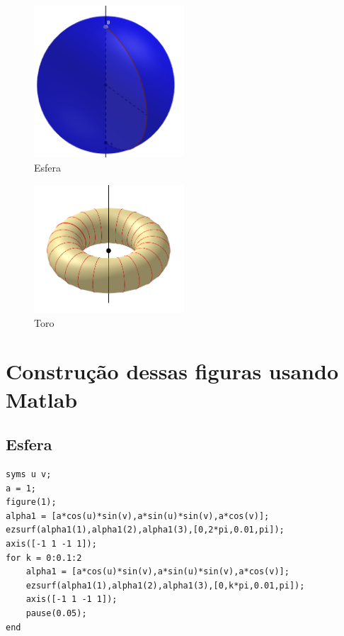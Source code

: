 \documentclass[a4paper]{article}
\begin{document}
\begin{figure}[h!]
  \caption{Esfera}
  \centering
  \includegraphics[width=0.5\textwidth]{cone_revolucao.png}
\end{figure}

\begin{figure}[h!]
  \caption{Toro}
  \centering
  \includegraphics[width=0.5\textwidth]{toro_revolucao.png}
\end{figure}

\section*{Construção dessas figuras usando Matlab} 
\subsection*{Esfera}
\lstset{language=matlab}

\begin{lstlisting}[frame=single]
syms u v;
a = 1;
figure(1);
alpha1 = [a*cos(u)*sin(v),a*sin(u)*sin(v),a*cos(v)];
ezsurf(alpha1(1),alpha1(2),alpha1(3),[0,2*pi,0.01,pi]);
axis([-1 1 -1 1]);
for k = 0:0.1:2
    alpha1 = [a*cos(u)*sin(v),a*sin(u)*sin(v),a*cos(v)];
    ezsurf(alpha1(1),alpha1(2),alpha1(3),[0,k*pi,0.01,pi]);
    axis([-1 1 -1 1]);
    pause(0.05);
end
\end{lstlisting}
\end{document}
